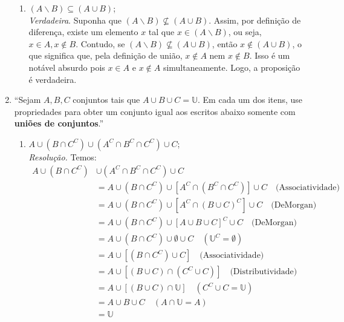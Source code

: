 \documentclass[13pt,letterpaper]{article}
\begin{document}
\begin{enumerate}
\begin{enumerate}
        \item $(A \backslash B) \subseteq (A \cup B)$; \\
        \emph{Verdadeira}. 
        Suponha que $(A \backslash B) \nsubseteq (A \cup B)$. Assim, por definição de diferença, existe um elemento $x$ tal que $x \in (A \backslash B)$, ou seja, $x \in A, x \notin B$. Contudo, se $(A \backslash B) \nsubseteq (A \cup B)$, então $x \notin (A \cup B)$, o que significa que, pela definição de união, $x \notin A \text{ nem } x \notin B$. Isso é um notável absurdo pois $x \in A$ e $x \notin A$ simultaneamente. Logo, a proposição é verdadeira.
    \end{enumerate}
    \item \enquote{Sejam $A, B, C$ conjuntos tais que $A \cup B \cup C = \mathbb{U}$. Em cada um dos itens, use propriedades para obter um conjunto igual aos escritos abaixo somente com \textbf{uniões de conjuntos}.}
    \begin{enumerate}
        \item $A \cup (B \cap C^C) \cup (A^C \cap B^C \cap C^C) \cup C$; \\
        \emph{Resolução.} Temos:
        \begin{align*}
           A \cup (B \cap C^C) &\cup (A^C \cap B^C \cap C^C) \cup C \\ &=
           A \cup (B \cap C^C) \cup [A^C \cap (B^C \cap C^C)] \cup C \quad \text{(Associatividade)} \\ &=
           A \cup (B \cap C^C) \cup [A^C \cap (B \cup C)^C] \cup C \quad \text{(DeMorgan)} \\ &=
           A \cup (B \cap C^C) \cup [A \cup B \cup C]^C \cup C \quad \text{(DeMorgan)} \\ &=
           A \cup (B \cap C^C) \cup \emptyset \cup C \quad (\mathbb{U}^C = \emptyset) \\ &= 
           A \cup [(B \cap C^C) \cup C] \quad \text{(Associatividade)} \\ &=
           A \cup [(B \cup C) \cap (C^C \cup C)] \quad \text{(Distributividade)} \\ &=
           A \cup [(B \cup C) \cap \mathbb{U}] \quad (C^C \cup C = \mathbb{U}) \\ &=
           A \cup B \cup C \quad (A \cap \mathbb{U} = A) \\ &=
           \mathbb{U}

\end{align*}
\end{enumerate}
\end{enumerate}
\end{document}
